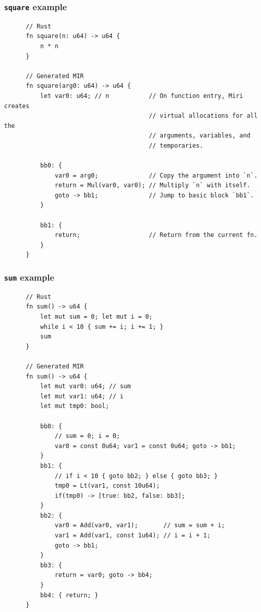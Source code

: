 \documentclass{beamer}
\begin{document}
\begin{frame}[fragile]
  \frametitle{\texttt{square} example}
  \begin{center}
    \begin{verbatim}
      // Rust
      fn square(n: u64) -> u64 {
          n * n
      }

      // Generated MIR
      fn square(arg0: u64) -> u64 {
          let var0: u64; // n           // On function entry, Miri creates
                                        // virtual allocations for all the
                                        // arguments, variables, and
                                        // temporaries.

          bb0: {
              var0 = arg0;              // Copy the argument into `n`.
              return = Mul(var0, var0); // Multiply `n` with itself.
              goto -> bb1;              // Jump to basic block `bb1`.
          }

          bb1: {
              return;                   // Return from the current fn.
          }
      }
    \end{verbatim}
  \end{center}
\end{frame}

\begin{frame}[fragile]
  \frametitle{\texttt{sum} example}
  \begin{center}
    \begin{verbatim}
      // Rust
      fn sum() -> u64 {
          let mut sum = 0; let mut i = 0;
          while i < 10 { sum += i; i += 1; }
          sum
      }

      // Generated MIR
      fn sum() -> u64 {
          let mut var0: u64; // sum
          let mut var1: u64; // i
          let mut tmp0: bool;

          bb0: {
              // sum = 0; i = 0;
              var0 = const 0u64; var1 = const 0u64; goto -> bb1;
          }
          bb1: {
              // if i < 10 { goto bb2; } else { goto bb3; }
              tmp0 = Lt(var1, const 10u64);
              if(tmp0) -> [true: bb2, false: bb3];
          }
          bb2: {
              var0 = Add(var0, var1);       // sum = sum + i;
              var1 = Add(var1, const 1u64); // i = i + 1;
              goto -> bb1;
          }
          bb3: {
              return = var0; goto -> bb4;
          }
          bb4: { return; }
      }
    \end{verbatim}
  \end{center}
\end{frame}
\end{document}

